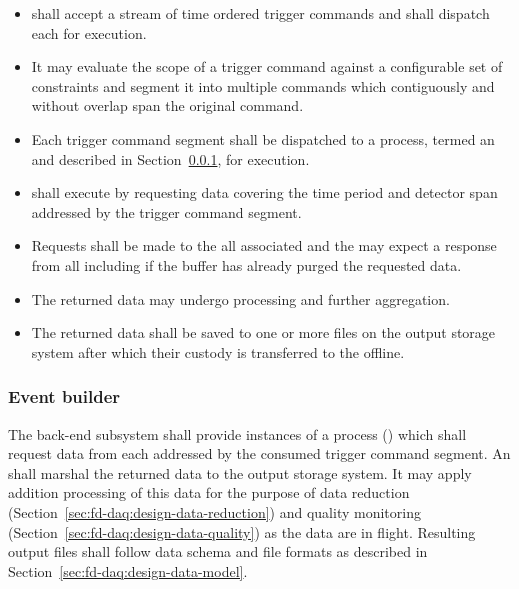 \begin{itemize}
\item {} shall accept a stream of time ordered trigger commands and shall dispatch each for execution.
\item It may evaluate the scope of a trigger command against a configurable set of constraints and segment it into multiple commands which contiguously and without overlap span the original command.
\item Each trigger command segment shall be dispatched to a process, termed an  and described in Section~\ref{sec:fd-daq:design-event-builder}, for execution.
\item {} shall execute by requesting data covering the time period and detector span addressed by the trigger command segment.
\item Requests shall be made to the all associated  and the  may expect a response from all including if the buffer has already purged the requested data.
\item The returned data may undergo processing and further aggregation.
\item The returned data shall be saved to one or more files on the output storage system after which their custody is transferred to the offline.
\end{itemize}



\subsubsection{Event builder}
\label{sec:fd-daq:design-event-builder}


The  back-end subsystem shall provide instances of a process () which shall request data from each  addressed by the consumed trigger command segment.  An  shall marshal the returned data to the output storage system.  It may apply addition processing of this data for the purpose of data reduction (Section~\ref{sec:fd-daq:design-data-reduction}) and quality monitoring (Section~\ref{sec:fd-daq:design-data-quality}) as the data are in flight. 
Resulting output files shall follow data schema and file formats as described in Section~\ref{sec:fd-daq:design-data-model}.


